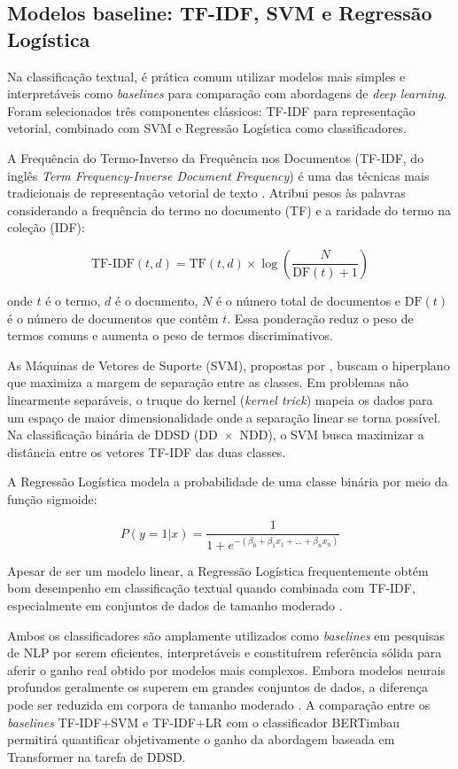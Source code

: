 \documentclass[
    12pt,                %
    openright,           %
    oneside,             %
    a4paper,             %
    english,             %
    brazil               %
]{abntex2}
\begin{document}
\subsection{Modelos baseline: TF-IDF, SVM e Regressão Logística}

Na classificação textual, é prática comum utilizar modelos mais simples e interpretáveis como \textit{baselines} para comparação com abordagens de \textit{deep learning}. Foram selecionados três componentes clássicos: TF-IDF para representação vetorial, combinado com SVM e Regressão Logística como classificadores.

A Frequência do Termo-Inverso da Frequência nos Documentos (TF-IDF, do inglês \textit{Term Frequency-Inverse Document Frequency}) é uma das técnicas mais tradicionais de representação vetorial de texto \cite{Manning2008}. Atribui pesos às palavras considerando a frequência do termo no documento (TF) e a raridade do termo na coleção (IDF):

\[
\text{TF-IDF}(t,d) = \text{TF}(t,d) \times \log\left(\frac{N}{\text{DF}(t) + 1}\right)
\]

onde \( t \) é o termo, \( d \) é o documento, \( N \) é o número total de documentos e \( \text{DF}(t) \) é o número de documentos que contêm \( t \). Essa ponderação reduz o peso de termos comuns e aumenta o peso de termos discriminativos.

As Máquinas de Vetores de Suporte (SVM), propostas por , buscam o hiperplano que maximiza a margem de separação entre as classes. Em problemas não linearmente separáveis, o truque do kernel (\textit{kernel trick}) mapeia os dados para um espaço de maior dimensionalidade onde a separação linear se torna possível. Na classificação binária de DDSD (DD~$\times$~NDD), o SVM busca maximizar a distância entre os vetores TF-IDF das duas classes.

A Regressão Logística modela a probabilidade de uma classe binária por meio da função sigmoide:

\[
P(y=1|x) = \frac{1}{1 + e^{-(\beta_0 + \beta_1 x_1 + \dots + \beta_n x_n)}}
\]

Apesar de ser um modelo linear, a Regressão Logística frequentemente obtém bom desempenho em classificação textual quando combinada com TF-IDF, especialmente em conjuntos de dados de tamanho moderado \cite{Manning2008}.

Ambos os classificadores são amplamente utilizados como \textit{baselines} em pesquisas de NLP por serem eficientes, interpretáveis e constituírem referência sólida para aferir o ganho real obtido por modelos mais complexos. Embora modelos neurais profundos geralmente os superem em grandes conjuntos de dados, a diferença pode ser reduzida em corpora de tamanho moderado \cite{Weld2022}. A comparação entre os \textit{baselines} TF-IDF+SVM e TF-IDF+LR com o classificador BERTimbau permitirá quantificar objetivamente o ganho da abordagem baseada em Transformer na tarefa de DDSD.
\end{document}
